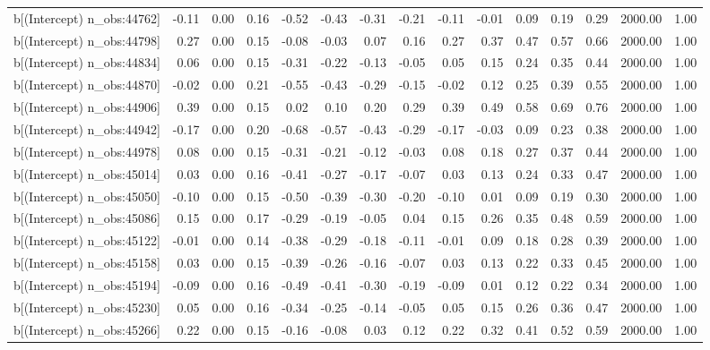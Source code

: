 \begin{table}[ht]
\begin{tabular}{rrrrrrrrrrrrrrr}
  b[(Intercept) n\_obs:44762] & -0.11 & 0.00 & 0.16 & -0.52 & -0.43 & -0.31 & -0.21 & -0.11 & -0.01 & 0.09 & 0.19 & 0.29 & 2000.00 & 1.00 \\ 
  b[(Intercept) n\_obs:44798] & 0.27 & 0.00 & 0.15 & -0.08 & -0.03 & 0.07 & 0.16 & 0.27 & 0.37 & 0.47 & 0.57 & 0.66 & 2000.00 & 1.00 \\ 
  b[(Intercept) n\_obs:44834] & 0.06 & 0.00 & 0.15 & -0.31 & -0.22 & -0.13 & -0.05 & 0.05 & 0.15 & 0.24 & 0.35 & 0.44 & 2000.00 & 1.00 \\ 
  b[(Intercept) n\_obs:44870] & -0.02 & 0.00 & 0.21 & -0.55 & -0.43 & -0.29 & -0.15 & -0.02 & 0.12 & 0.25 & 0.39 & 0.55 & 2000.00 & 1.00 \\ 
  b[(Intercept) n\_obs:44906] & 0.39 & 0.00 & 0.15 & 0.02 & 0.10 & 0.20 & 0.29 & 0.39 & 0.49 & 0.58 & 0.69 & 0.76 & 2000.00 & 1.00 \\ 
  b[(Intercept) n\_obs:44942] & -0.17 & 0.00 & 0.20 & -0.68 & -0.57 & -0.43 & -0.29 & -0.17 & -0.03 & 0.09 & 0.23 & 0.38 & 2000.00 & 1.00 \\ 
  b[(Intercept) n\_obs:44978] & 0.08 & 0.00 & 0.15 & -0.31 & -0.21 & -0.12 & -0.03 & 0.08 & 0.18 & 0.27 & 0.37 & 0.44 & 2000.00 & 1.00 \\ 
  b[(Intercept) n\_obs:45014] & 0.03 & 0.00 & 0.16 & -0.41 & -0.27 & -0.17 & -0.07 & 0.03 & 0.13 & 0.24 & 0.33 & 0.47 & 2000.00 & 1.00 \\ 
  b[(Intercept) n\_obs:45050] & -0.10 & 0.00 & 0.15 & -0.50 & -0.39 & -0.30 & -0.20 & -0.10 & 0.01 & 0.09 & 0.19 & 0.30 & 2000.00 & 1.00 \\ 
  b[(Intercept) n\_obs:45086] & 0.15 & 0.00 & 0.17 & -0.29 & -0.19 & -0.05 & 0.04 & 0.15 & 0.26 & 0.35 & 0.48 & 0.59 & 2000.00 & 1.00 \\ 
  b[(Intercept) n\_obs:45122] & -0.01 & 0.00 & 0.14 & -0.38 & -0.29 & -0.18 & -0.11 & -0.01 & 0.09 & 0.18 & 0.28 & 0.39 & 2000.00 & 1.00 \\ 
  b[(Intercept) n\_obs:45158] & 0.03 & 0.00 & 0.15 & -0.39 & -0.26 & -0.16 & -0.07 & 0.03 & 0.13 & 0.22 & 0.33 & 0.45 & 2000.00 & 1.00 \\ 
  b[(Intercept) n\_obs:45194] & -0.09 & 0.00 & 0.16 & -0.49 & -0.41 & -0.30 & -0.19 & -0.09 & 0.01 & 0.12 & 0.22 & 0.34 & 2000.00 & 1.00 \\ 
  b[(Intercept) n\_obs:45230] & 0.05 & 0.00 & 0.16 & -0.34 & -0.25 & -0.14 & -0.05 & 0.05 & 0.15 & 0.26 & 0.36 & 0.47 & 2000.00 & 1.00 \\ 
  b[(Intercept) n\_obs:45266] & 0.22 & 0.00 & 0.15 & -0.16 & -0.08 & 0.03 & 0.12 & 0.22 & 0.32 & 0.41 & 0.52 & 0.59 & 2000.00 & 1.00 \\ 

\end{tabular}
\end{table}
